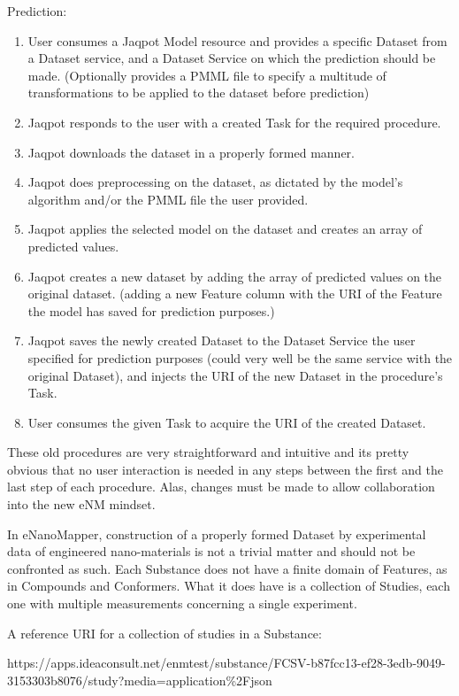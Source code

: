  
\noindent Prediction:
\begin{enumerate}
\item  User consumes a Jaqpot Model resource and provides a specific Dataset from a Dataset service, and a Dataset Service on which the prediction should be made. (Optionally provides a PMML file to specify a multitude of transformations to be applied to the dataset before prediction)
\item Jaqpot responds to the user with a created Task for the required procedure.
\item Jaqpot downloads the dataset in a properly formed manner.
\item Jaqpot does preprocessing on the dataset, as dictated by the model’s algorithm and/or the PMML file the user provided.
\item Jaqpot applies the selected model on the dataset and creates an array of predicted values.
\item Jaqpot creates a new dataset by adding the array of predicted values on the original dataset. (adding a new Feature column with the URI of the Feature the model has saved for prediction purposes.)
\item Jaqpot saves the newly created Dataset to the Dataset Service the user specified for prediction purposes (could very well be the same service with the original Dataset), and injects the URI of the new Dataset in the procedure’s Task.
\item User consumes the given Task to acquire the URI of the created Dataset.
\end{enumerate}

These old procedures are very straightforward and intuitive and its pretty 
obvious that no user interaction is needed in any steps between the first 
and the last step of each procedure. Alas, changes must be made to allow 
collaboration into the new eNM mindset.


In eNanoMapper, construction of a properly formed Dataset by experimental 
data of engineered nano-materials is not a trivial matter and should not be 
confronted as such. Each Substance does not have a finite domain of Features, 
as in Compounds and Conformers. What it does have is a collection of Studies, 
each one with multiple measurements concerning a single experiment. 

A reference URI for a collection of studies in a Substance: 

https://apps.ideaconsult.net/enmtest/substance/FCSV-b87fcc13-ef28-3edb-9049-3153303b8076/study?media=application\%2Fjson

